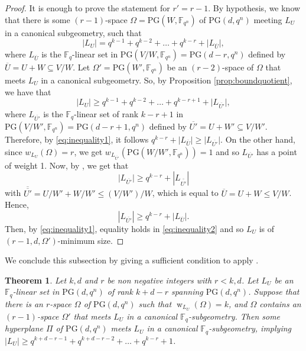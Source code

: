 \documentclass[11pt]{article}
\newtheorem{theorem}{Theorem}[section]
\theoremstyle{definition}
\newcommand{\F}{{\mathbb F}}
\newcommand{\fq}{{\mathbb F}_{q}}
\newcommand{\PG}{\mathrm{PG}}
\DeclareMathOperator{\ww}{w}
\begin{document}
\begin{proof}
 It is enough to prove the statement for $r'=r-1$.
 By hypothesis, we know that there is some $(r-1)$-space $\Omega=\PG(W,\F_{q^n})$ of $\PG(d,q^n)$ meeting $L_U$ in a canonical subgeometry, such that 
\begin{equation} \label{eq:inequality1}
 \lvert L_U \rvert=  q^{k-1}+q^{k-2}+\ldots+q^{k-r}+\lvert  L_{\overline{U}} \rvert,
\end{equation}
 where $ L_{\overline{U}} $ is the $\F_q$-linear set in $\PG(V/W,\F_{q^n})=\PG(d-r,q^n)$ defined by $\overline{U}=U+W \subseteq V/W$. 
 Let $ \Omega'= \PG(W',\F_{q^n}) $ be an $(r-2)$-space of $\Omega$ that meets $L_U$ in a canonical subgeometry.
 So, by Proposition \ref{prop:boundquotient}, we have that 
\begin{equation} \label{eq:inequality2}
 \lvert L_U \rvert \geq   q^{k-1}+q^{k-2}+\ldots+q^{k-r+1}+\lvert  L_{\overline{U'}} \rvert,
\end{equation}
 where $ L_{\overline{U'}} $ is the $\F_q$-linear set of rank $k-r+1$ in $\PG(V/W',\F_{q^n})=\PG(d-r+1,q^n)$ defined by $\overline{U'}=U+W' \subseteq V/W'$. Therefore, by \eqref{eq:inequality1}, it follows $q^{k-r}+\lvert  L_{\overline{U}} \rvert \geq \lvert  L_{\overline{U'}} \rvert$. 
 On the other hand, since $w_{L_U}(\Omega)=r$, we get $ w_{L_{\overline{U'}}}(\PG(W/W',\F_{q^n}))=1$ and so $L_{\overline{U'}}$ has a point of weight 1. 
 Now, by , we get that 
 \[
\lvert L_{\overline{U'}} \rvert \geq q^{k-r}+ \left\lvert L_{\overline{\overline{U'}}} \right\rvert
 \]
 with $\overline{{\overline {U'}}} = U/W' + W/W' \leq (V/W')/W$, which is equal to $\overline U = U + W \leq V/W$.
 Hence,
 \[
  |L_{\overline {U'}}| \geq q^{k-r}+ \lvert L_{\overline{U}} \rvert.
 \]
 Then, by \eqref{eq:inequality1}, equality holds in \eqref{eq:inequality2} and so $L_U$ is of $(r-1,d,\Omega')$-minimum size.
\end{proof}

We conclude this subsection by giving a sufficient condition to apply .

\begin{theorem}
 \label{th:Rank=k+d-r}
Let $k,d$ and $r$ be non negative integers with $r<k,d$. Let $L_U$ be an $\F_q$-linear set in $\PG(d,q^n)$ of rank $k+d-r$ spanning $\PG(d,q^n)$.
Suppose that there is an $r$-space $\Omega$ of $\PG(d,q^n)$ such that $\ww_{L_U}(\Omega)=k$, and $\Omega$ contains an $(r-1)$-space $\Omega'$ that meets $L_U$ in a canonical $\fq$-subgeometry.
Then some hyperplane $\Pi$ of $\PG(d,q^n)$ meets $L_U$ in a canonical $\fq$-subgeometry, implying $\lvert L_U \rvert \geq q^{k+d-r-1}+q^{k+d-r-2}+\ldots+q^{k-r}+1$.
\end{theorem}
\end{document}
